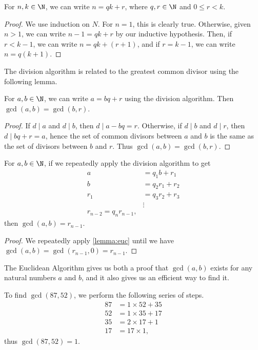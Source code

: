 \documentclass[a4paper]{scrartcl}
\begin{document}
\begin{proposition}
	For $n, k \in \N$, we can write $n = qk + r$, where $q, r \in \N$ and $0 \leq r < k$.
\end{proposition}
\begin{proof}
	We use induction on $N$. For $n = 1$, this is clearly true. Otherwise, given $n > 1$, we can write $n - 1 = qk + r$ by our inductive hypothesis. Then, if $r < k - 1$, we can write $n = qk + (r + 1)$, and if $r = k - 1$, we can write $n = q(k + 1)$.
\end{proof}

The division algorithm is related to the greatest common divisor using the following lemma.

\begin{lemma}[Euclid]\label{lemma:euc}
	For $a, b \in \N$, we can write $a = bq + r$ using the division algorithm. Then $\gcd(a, b) = \gcd(b, r)$.
\end{lemma}
\begin{proof}
	If $d \mid a$ and $d \mid b$, then $d \mid a - bq = r$.
	Otherwise, if $d \mid b$ and $d \mid r$, then $d \mid bq + r = a$, hence the set of common divisors between $a$ and $b$ is the same as the set of divisors between $b$ and $r$. Thus $\gcd(a, b) = \gcd(b, r)$.
\end{proof}

\begin{theorem}
	For $a, b \in \N$, if we repeatedly apply the division algorithm to get
	\begin{align*}
		a &= q_1 b + r_1 \\
		b &= q_2 r_1 + r_2 \\
		r_1 &= q_3 r_2 + r_3 \\
		&\vdots \\
		r_{n - 2} = q_n r_{n - 1},
	\end{align*}
	then $\gcd(a, b) = r_{n - 1}$.
\end{theorem}
\begin{proof}
	We repeatedly apply \autoref{lemma:euc} until we have $\gcd(a, b) = \gcd(r_{n - 1}, 0) = r_{n - 1}$.
\end{proof}

The Euclidean Algorithm gives us both a proof that $\gcd(a, b)$ exists for any natural numbers $a$ and $b$, and it also gives us an efficient way to find it.

\begin{example}
	To find $\gcd(87, 52)$, we perform the following series of steps.
	\begin{align*}
		87 &= 1 \times 52 + 35 \\
		52 &= 1 \times 35 + 17 \\
		35 &= 2 \times 17 + 1\\
		17 &= 17 \times 1,
	\end{align*}
	thus $\gcd(87, 52) = 1$.
\end{example}
\end{document}
